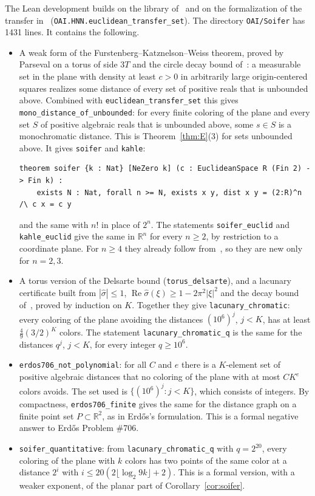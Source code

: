 \documentclass[11pt]{amsart}
\theoremstyle{definition}
\newcommand{\R}{\mathbb{R}}
\begin{document}
The Lean development builds on the library of~\cite{OAI} and on the formalization of the transfer in~\cite{BassR3} (\texttt{OAI.HNN.euclidean\_\allowbreak{}transfer\_\allowbreak{}set}). The directory \texttt{OAI/Soifer} has 1431 lines. It contains the following.
\begin{itemize}
\item A weak form of the Furstenberg--Katznelson--Weiss theorem, proved by Parseval on a torus of side $3T$ and the circle decay bound of~\cite{OAI}: a measurable set in the plane with density at least $c>0$ in arbitrarily large origin-centered squares realizes some distance of every set of positive reals that is unbounded above. Combined with \texttt{euclidean\_\allowbreak{}transfer\_\allowbreak{}set} this gives \texttt{mono\_\allowbreak{}distance\_\allowbreak{}of\_\allowbreak{}unbounded}: for every finite coloring of the plane and every set $S$ of positive algebraic reals that is unbounded above, some $s\in S$ is a monochromatic distance. This is Theorem~\ref{thm:E}(3) for sets unbounded above. It gives \texttt{soifer} and \texttt{kahle}:
\begin{Verbatim}[fontsize=\footnotesize]
theorem soifer {k : Nat} [NeZero k] (c : EuclideanSpace R (Fin 2) -> Fin k) :
    exists N : Nat, forall n >= N, exists x y, dist x y = (2:R)^n /\ c x = c y
\end{Verbatim}
and the same with $n!$ in place of $2^n$. The statements \texttt{soifer\_\allowbreak{}euclid} and \texttt{kahle\_\allowbreak{}euclid} give the same in $\R^n$ for every $n\ge2$, by restriction to a coordinate plane. For $n\ge4$ they already follow from~\cite[Theorem 1.3]{Davies}, so they are new only for $n=2,3$.
\item A torus version of the Delsarte bound (\texttt{torus\_\allowbreak{}delsarte}), and a lacunary certificate built from $|\hat\sigma|\le1$, $\operatorname{Re}\hat\sigma(\xi)\ge1-2\pi^2|\xi|^2$ and the decay bound of~\cite{OAI}, proved by induction on $K$. Together they give \texttt{lacunary\_\allowbreak{}chromatic}: every coloring of the plane avoiding the distances $(10^6)^j$, $j<K$, has at least $\frac49(3/2)^K$ colors. The statement \texttt{lacunary\_\allowbreak{}chromatic\_\allowbreak{}q} is the same for the distances $q^j$, $j<K$, for every integer $q\ge10^6$.
\item \texttt{erdos706\_\allowbreak{}not\_\allowbreak{}polynomial}: for all $C$ and $e$ there is a $K$-element set of positive algebraic distances that no coloring of the plane with at most $CK^e$ colors avoids. The set used is $\{(10^6)^j:j<K\}$, which consists of integers. By compactness, \texttt{erdos706\_\allowbreak{}finite} gives the same for the distance graph on a finite point set $P\subset\R^2$, as in Erd\H{o}s's formulation. This is a formal negative answer to Erd\H{o}s Problem \#706.
\item \texttt{soifer\_\allowbreak{}quantitative}: from \texttt{lacunary\_\allowbreak{}chromatic\_\allowbreak{}q} with $q=2^{20}$, every coloring of the plane with $k$ colors has two points of the same color at a distance $2^i$ with $i\le 20(2\lfloor\log_2 9k\rfloor+2)$. This is a formal version, with a weaker exponent, of the planar part of Corollary~\ref{cor:soifer}.
\end{itemize}
\end{document}
